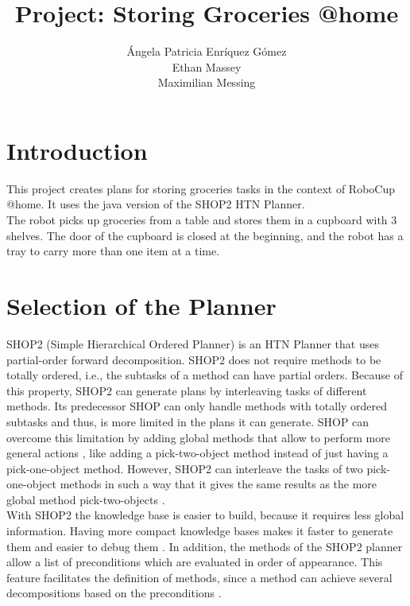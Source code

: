 \documentclass[paper=a4, fontsize=11pt]{scrartcl}
\title{Project: Storing Groceries @home}
\author{\'{A}ngela Patricia Enr\'{i}quez G\'{o}mez \\
	Ethan Massey \\
	Maximilian Messing}
\begin{document}
	\maketitle

 	\section{Introduction}

 	This project creates plans for storing groceries tasks in the context of RoboCup @home. It uses the java version of the SHOP2 HTN Planner. \\

 	The robot picks up groceries from a table and stores them in a cupboard with 3 shelves. The door of the cupboard is closed at the beginning,
 	and the robot has a tray to carry more than one item at a time.

 	\section{Selection of the Planner}

 	SHOP2 (Simple Hierarchical Ordered Planner) is an HTN Planner that uses partial-order forward decomposition. SHOP2 does not require methods to be totally ordered, i.e., the subtasks of a method can have partial orders. Because of this property, SHOP2 can generate plans by interleaving tasks of different methods. Its predecessor SHOP can only handle methods with totally ordered subtasks and thus, is more limited in the plans it can generate. SHOP can overcome this limitation by adding global methods that allow to perform more general actions \cite{Nau2001}, like adding a pick-two-object method instead of just having a pick-one-object method. However, SHOP2 can interleave the tasks of two pick-one-object methods in such a way that it gives the same results as the more global method pick-two-objects \cite{slides}. \\

 	With SHOP2 the knowledge base is easier to build, because it requires less global information. Having more compact knowledge bases makes it faster to generate them and easier to debug them \cite{Nau2001}. In addition, the methods of the SHOP2 planner allow a list of preconditions which are evaluated in order of appearance. This feature facilitates the definition of methods, since a method can achieve several decompositions based on the preconditions \cite{Nau2003}. \\
\end{document}
